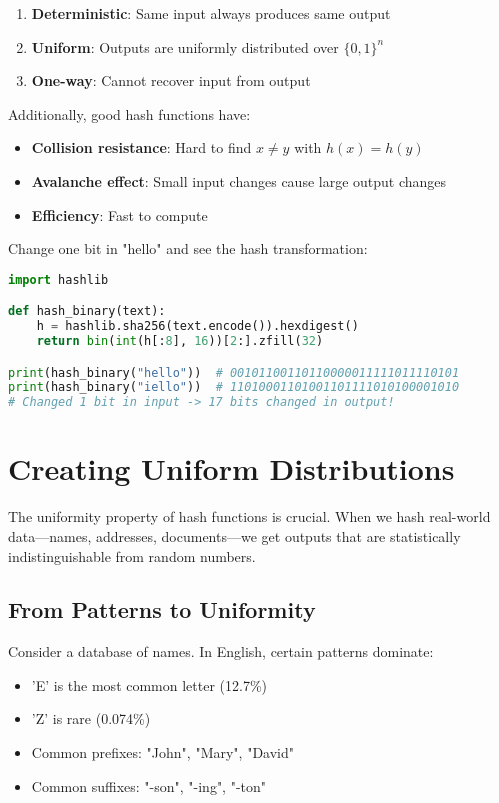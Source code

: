 \begin{enumerate}
    \item \textbf{Deterministic}: Same input always produces same output
    \item \textbf{Uniform}: Outputs are uniformly distributed over $\{0,1\}^n$
    \item \textbf{One-way}: Cannot recover input from output
\end{enumerate}

Additionally, good hash functions have:
\begin{itemize}
    \item \textbf{Collision resistance}: Hard to find $x \neq y$ with $h(x) = h(y)$
    \item \textbf{Avalanche effect}: Small input changes cause large output changes
    \item \textbf{Efficiency}: Fast to compute
\end{itemize}

\begin{example}
Change one bit in "hello" and see the hash transformation:
\begin{lstlisting}[language=Python]
import hashlib

def hash_binary(text):
    h = hashlib.sha256(text.encode()).hexdigest()
    return bin(int(h[:8], 16))[2:].zfill(32)

print(hash_binary("hello"))  # 00101100110110000011111011110101
print(hash_binary("iello"))  # 11010001101001101111010100001010
# Changed 1 bit in input -> 17 bits changed in output!
\end{lstlisting}
\end{example}

\section{Creating Uniform Distributions}

The uniformity property of hash functions is crucial. When we hash real-world data—names, addresses, documents—we get outputs that are statistically indistinguishable from random numbers.

\subsection{From Patterns to Uniformity}

Consider a database of names. In English, certain patterns dominate:
\begin{itemize}
    \item 'E' is the most common letter (12.7\%)
    \item 'Z' is rare (0.074\%)
    \item Common prefixes: "John", "Mary", "David"
    \item Common suffixes: "-son", "-ing", "-ton"
\end{itemize}

